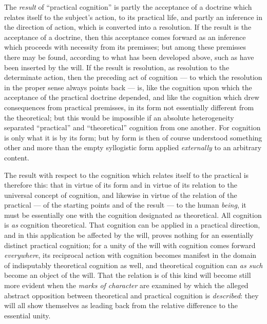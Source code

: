 \documentclass[12pt,a4paper]{book}
\begin{document}
The \emph{result} of ``practical cognition'' is partly the acceptance of a
doctrine which relates itself to the subject's action, to its practical life,
and partly an inference in the direction of action, which is converted into a
resolution. If the result is the acceptance of a doctrine, then this
acceptance comes forward as an inference which proceeds with necessity from
its premisses; but among these premisses there may be found, according to what
has been developed above, such as have been inserted by the will. If the
result is resolution, as resolution to the determinate action, then the
preceding act of cognition --- to which the resolution in the proper sense
always points back --- is, like the cognition upon which the acceptance of the
practical doctrine depended, and like the cognition which drew consequences
from practical premisses, in its form not essentially different from the
theoretical; but this would be impossible if an absolute heterogeneity
separated ``practical'' and ``theoretical'' cognition from one another. For
cognition is only what it is by its form; but by form is then of course
understood something other and more than the empty syllogistic form applied
\emph{externally} to an arbitrary content.

The result with respect to the cognition which relates itself to the practical
is therefore this: that in virtue of its form and in virtue of its relation to
the universal concept of cognition, and likewise in virtue of the relation of
the practical --- of the starting points and of the result --- to the human
\emph{being}, it must be essentially one with the cognition designated as
theoretical. All cognition is \emph{as} cognition theoretical. That cognition
can be applied in a practical direction, and in this application be affected
by the will, proves nothing for an essentially distinct practical cognition;
for a unity of the will with cognition comes forward \emph{everywhere}, its
reciprocal action with cognition becomes manifest in the domain of
indisputably theoretical cognition as well, and theoretical cognition can
\emph{as such} become an object of the will.
That the relation is of this kind will become still more evident when the
\emph{marks of character} are examined by which the alleged abstract
opposition between theoretical and practical cognition is \emph{described}:
they will all show themselves as leading back from the relative difference to
the essential unity.
\end{document}
